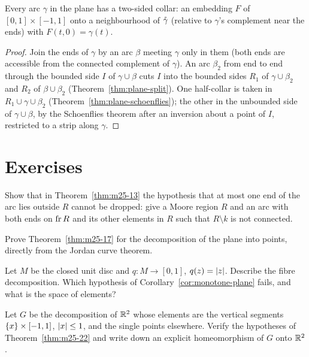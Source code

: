 
\begin{theorem}\label{thm:collar}
Every arc $\gamma$ in the plane has a two-sided collar: an embedding $F$ of $[0,1]\times[-1,1]$ onto a neighbourhood of
$\mathring{\gamma}$ (relative to $\gamma$'s complement near the ends) with $F(t,0)=\gamma(t)$.
\end{theorem}

\begin{proof}
Join the ends of $\gamma$ by an arc $\beta$ meeting $\gamma$ only in them (both ends are accessible from the connected
complement of $\gamma$). An arc $\beta_2$ from end to end through the bounded side $I$ of $\gamma\cup\beta$ cuts $I$ into the
bounded sides $R_1$ of $\gamma\cup\beta_2$ and $R_2$ of $\beta\cup\beta_2$ (Theorem~\ref{thm:plane-split}). One half-collar is
taken in $R_1\cup\gamma\cup\beta_2$ (Theorem~\ref{thm:plane-schoenflies}); the other in the unbounded side of $\gamma\cup\beta$,
by the Schoenflies theorem after an inversion about a point of $I$, restricted to a strip along $\gamma$.
\end{proof}


\section*{Exercises}

\begin{exercise}
Show that in Theorem~\ref{thm:m25-13} the hypothesis that at most one end of the arc lies outside $R$ cannot be
dropped: give a Moore region $R$ and an arc with both ends on $\operatorname{fr} R$ and its other elements in $R$ such that $R\setminus k$
is not connected.
\end{exercise}

\begin{exercise}
Prove Theorem~\ref{thm:m25-17} for the decomposition of the plane into points, directly from the Jordan curve theorem.
\end{exercise}

\begin{exercise}
Let $M$ be the closed unit disc and $q\colon M\to[0,1]$, $q(z)=\left\lvert z\right\rvert$. Describe the fibre decomposition. Which hypothesis of
Corollary~\ref{cor:monotone-plane} fails, and what is the space of elements?
\end{exercise}

\begin{exercise}
Let $G$ be the decomposition of $\mathbb{R}^2$ whose elements are the vertical segments $\left\{ x \right\}\times[-1,1]$, $\left\lvert x\right\rvert\le1$, and the
single points elsewhere. Verify the hypotheses of Theorem~\ref{thm:m25-22} and write down an explicit homeomorphism
of $G$ onto $\mathbb{R}^2$.
\end{exercise}
